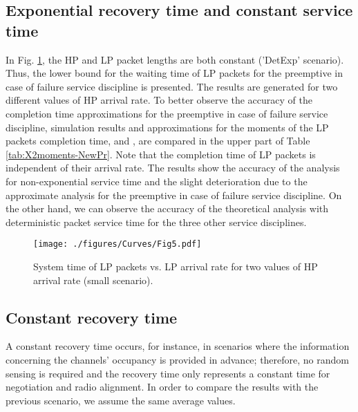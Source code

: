 \documentclass[11pt,journal,oneside,onecolumn,draftclsnofoot]{IEEEtran}
\begin{document}
\subsection{Exponential recovery time and constant service time}

In Fig. \ref{29212-27212-DESmall}, the HP and LP packet lengths are both constant ('DetExp' scenario). Thus, the lower bound for the waiting time of LP packets for the preemptive in case of failure service discipline is presented. The results are generated for two different values of HP arrival rate. To better observe the accuracy of the completion time approximations for the preemptive in case of failure service discipline, simulation results and approximations for the moments of the LP packets completion time,  and  , are compared in the upper part of Table \ref{tab:X2moments-NewPr}. Note that the completion time of LP packets is independent of their arrival rate. The results show the accuracy of the analysis for non-exponential service time and the slight deterioration due to the approximate analysis for the preemptive in case of failure service discipline. On the other hand, we can observe the accuracy of the theoretical analysis with deterministic packet service time for the three other service disciplines.
\begin{figure}\texttt{[image: ./figures/Curves/Fig5.pdf]}\caption{System time of LP packets vs. LP arrival rate for two values of HP arrival rate (small scenario).}\label{29212-27212-DESmall}\end{figure}

\subsection{Constant recovery time}
A constant recovery time occurs, for instance, in scenarios where the information concerning the channels' occupancy is provided in advance; therefore, no random sensing is required and the recovery time only represents a constant time for negotiation and radio alignment. In order to compare the results with the previous scenario, we assume the same average values. 
\end{document}
